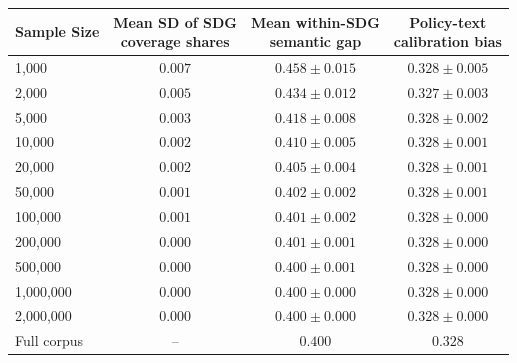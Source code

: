 \begin{tabular}{lccc}
\toprule
Sample Size & \shortstack{Mean SD of SDG\\coverage shares} & \shortstack{Mean within-SDG\\semantic gap} & \shortstack{Policy-text\\calibration bias} \\
\midrule
1,000 & $0.007$ & $0.458 \pm 0.015$ & $0.328 \pm 0.005$ \\
2,000 & $0.005$ & $0.434 \pm 0.012$ & $0.327 \pm 0.003$ \\
5,000 & $0.003$ & $0.418 \pm 0.008$ & $0.328 \pm 0.002$ \\
10,000 & $0.002$ & $0.410 \pm 0.005$ & $0.328 \pm 0.001$ \\
20,000 & $0.002$ & $0.405 \pm 0.004$ & $0.328 \pm 0.001$ \\
50,000 & $0.001$ & $0.402 \pm 0.002$ & $0.328 \pm 0.001$ \\
100,000 & $0.001$ & $0.401 \pm 0.002$ & $0.328 \pm 0.000$ \\
200,000 & $0.000$ & $0.401 \pm 0.001$ & $0.328 \pm 0.000$ \\
500,000 & $0.000$ & $0.400 \pm 0.001$ & $0.328 \pm 0.000$ \\
1,000,000 & $0.000$ & $0.400 \pm 0.000$ & $0.328 \pm 0.000$ \\
2,000,000 & $0.000$ & $0.400 \pm 0.000$ & $0.328 \pm 0.000$ \\
Full corpus & -- & $0.400$ & $0.328$ \\
\bottomrule
\end{tabular}
